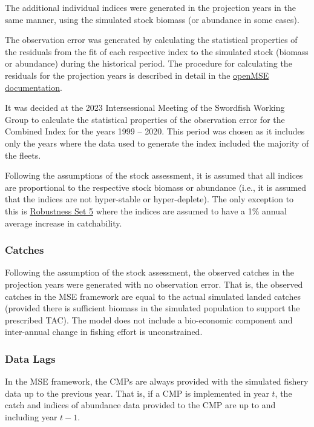 \documentclass[
]{article}
\begin{document}
The additional individual indices were generated in the projection years in the same manner, using the simulated stock biomass (or abundance in some cases).

The observation error was generated by calculating the statistical properties of the residuals from the fit of each respective index to the simulated stock (biomass or abundance) during the historical period. The procedure for calculating the residuals for the projection years is described in detail in the \href{https://openmse.com/features-conditioning-oms/indices/}{openMSE documentation}.

It was decided at the 2023 Intersessional Meeting of the Swordfish Working Group to calculate the statistical properties of the observation error for the Combined Index for the years 1999 -- 2020. This period was chosen as it includes only the years where the data used to generate the index included the majority of the fleets.

Following the assumptions of the stock assessment, it is assumed that all indices are proportional to the respective stock biomass or abundance (i.e., it is assumed that the indices are not hyper-stable or hyper-deplete). The only exception to this is \protect\hyperlink{R5}{Robustness Set 5} where the indices are assumed to have a 1\% annual average increase in catchability.

\hypertarget{catches}{%
\subsubsection{Catches}\label{catches}}

Following the assumption of the stock assessment, the observed catches in the projection years were generated with no observation error. That is, the observed catches in the MSE framework are equal to the actual simulated landed catches (provided there is sufficient biomass in the simulated population to support the prescribed TAC). The model does not include a bio-economic component and inter-annual change in fishing effort is unconstrained.

\hypertarget{data-lags}{%
\subsubsection{Data Lags}\label{data-lags}}

In the MSE framework, the CMPs are always provided with the simulated fishery data up to the previous year. That is, if a CMP is implemented in year \(t\), the catch and indices of abundance data provided to the CMP are up to and including year \(t-1\).
\end{document}
